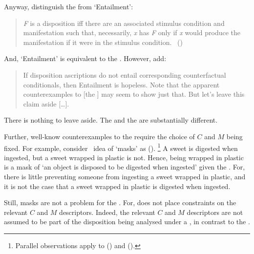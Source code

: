 \begin{note}
{    Anyway, \citeauthor{Choi:2021wg} distinguish the \dSCAa{} from `Entailment':
    \begin{quote}
      \emph{F} is a disposition iff there are an associated stimulus condition and manifestation such that, necessarily, \emph{x} has \emph{F} only if \emph{x} would produce the manifestation if it were in the stimulus condition.%
      \mbox{ }\hfill\mbox{(\citeyear[\S2.1]{Choi:2021wg})}
    \end{quote}
    And, `Entailment' is equivalent to the .
    However, \citeauthor{Choi:2021wg} add:
    \begin{quote}
      If disposition ascriptions do not entail corresponding counterfactual conditionals, then Entailment is hopeless.
      Note that the apparent counterexamples to [the \dSCAa{}] may seem to show just that.
      But let's leave this claim aside [\dots].
    \end{quote}
    There is nothing to leave aside.
    The \dSCAa{} and the \dBCAa{} are substantially different.
  }

  Further, well-know counterexamples to the \dSCAa{} require the choice of \(C\) and \(M\) being fixed.
  For example, consider~\citeauthor{Clarke:2010aa} idea of `masks' as  (\citeyear[153]{Clarke:2010aa}).%
  \footnote{
    Parallel observations apply to (\cite{Johnston:1992aa}) and (\cite{Martin:1994aa}).
  }
  A sweet is digested when ingested, but a sweet wrapped in plastic is not.
  Hence, being wrapped in plastic is a mask of `an object is disposed to be digested when ingested' given the \dSCAa{}.
  For, there is little preventing someone from ingesting a sweet wrapped in plastic, and it is not the case that a sweet wrapped in plastic is digested when ingested.

  Still, masks are not a problem for the \dBCAa{}.
  For, \dBCAa{} does not place constraints on the relevant \(C\) and \(M\) descriptors.
  Indeed, the relevant \(C\) and \(M\) descriptors are not assumed to be part of the disposition being analysed under a \dBCAa{}, in contrast to the \dSCAa{}.


\end{note}
